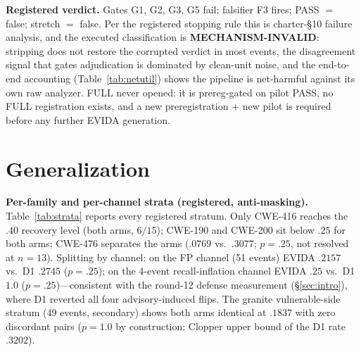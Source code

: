\documentclass[sigconf,nonacm]{acmart}
\begin{document}
\textbf{Registered verdict.} Gates G1, G2, G3, G5 fail; falsifier F3
fires; PASS $=$ false; stretch $=$ false. Per the registered stopping
rule this is charter-\S10 failure analysis, and the executed
classification is \textbf{MECHANISM-INVALID}: stripping does not restore
the corrupted verdict in most events, the disagreement signal that
gates adjudication is dominated by clean-unit noise, and the end-to-end
accounting (Table~\ref{tab:netutil}) shows the pipeline is net-harmful
against its own raw analyzer. FULL never opened:
it is prereg-gated on pilot PASS, no FULL registration exists, and a new
preregistration $+$ new pilot is required before any further EVIDA
generation.

\section{Generalization}\label{sec:generalization}
\textbf{Per-family and per-channel strata (registered, anti-masking).}
Table~\ref{tab:strata} reports every registered stratum. Only CWE-416
reaches the $.40$ recovery level (both arms, $6/15$); CWE-190 and
CWE-200 sit below $.25$ for both arms; CWE-476 separates the arms
($.0769$ vs.\ $.3077$; $p{=}.25$, not resolved at $n{=}13$). Splitting
by channel: on the FP channel (51 events) EVIDA $.2157$ vs.\ D1 $.2745$
($p{=}.25$); on the 4-event recall-inflation channel EVIDA $.25$ vs.\
D1 $1.0$ ($p{=}.25$)---consistent with the round-12 defense measurement
(\S\ref{sec:intro}), where D1 reverted all four advisory-induced flips.
The granite vulnerable-side stratum (49 events,
secondary) shows both arms identical at $.1837$ with zero discordant
pairs ($p{=}1.0$ by construction; Clopper upper bound of the D1 rate
$.3202$).
\end{document}
